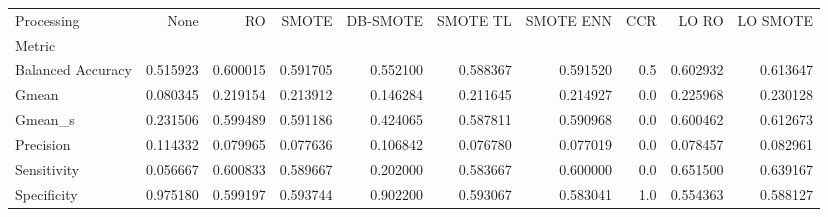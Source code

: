 \begin{tabular}{lrrrrrrrrr}
\toprule
Processing &      None &        RO &     SMOTE &  DB-SMOTE &  SMOTE TL &  SMOTE ENN &  CCR &     LO RO &  LO SMOTE \\
Metric            &           &           &           &           &           &            &      &           &           \\
\midrule
Balanced Accuracy &  0.515923 &  0.600015 &  0.591705 &  0.552100 &  0.588367 &   0.591520 &  0.5 &  0.602932 &  0.613647 \\
Gmean             &  0.080345 &  0.219154 &  0.213912 &  0.146284 &  0.211645 &   0.214927 &  0.0 &  0.225968 &  0.230128 \\
Gmean_s           &  0.231506 &  0.599489 &  0.591186 &  0.424065 &  0.587811 &   0.590968 &  0.0 &  0.600462 &  0.612673 \\
Precision         &  0.114332 &  0.079965 &  0.077636 &  0.106842 &  0.076780 &   0.077019 &  0.0 &  0.078457 &  0.082961 \\
Sensitivity       &  0.056667 &  0.600833 &  0.589667 &  0.202000 &  0.583667 &   0.600000 &  0.0 &  0.651500 &  0.639167 \\
Specificity       &  0.975180 &  0.599197 &  0.593744 &  0.902200 &  0.593067 &   0.583041 &  1.0 &  0.554363 &  0.588127 \\
\bottomrule
\end{tabular}
